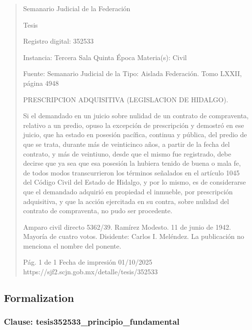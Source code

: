 \documentclass[11pt,a4paper]{article}
\begin{document}
\begin{quote}
                                                   Semanario Judicial de la Federación

                                                  Tesis

 Registro digital: 352533

 Instancia: Tercera Sala          Quinta Época                         Materia(s): Civil

                                  Fuente: Semanario Judicial de la     Tipo: Aislada
                                  Federación.
                                  Tomo LXXII, página 4948


PRESCRIPCION ADQUISITIVA (LEGISLACION DE HIDALGO).


Si el demandado en un juicio sobre nulidad de un contrato de compraventa, relativo a un predio,
opuso la excepción de prescripción y demostró en ese juicio, que ha estado en posesión pacífica,
continua y pública, del predio de que se trata, durante más de veinticinco años, a partir de la fecha
del contrato, y más de veintiuno, desde que el mismo fue registrado, debe decirse que ya sea que
esa posesión la hubiera tenido de buena o mala fe, de todos modos transcurrieron los términos
señalados en el artículo 1045 del Código Civil del Estado de Hidalgo, y por lo mismo, es de
considerarse que el demandado adquirió en propiedad el inmueble, por prescripción adquisitiva, y
que la acción ejercitada en su contra, sobre nulidad del contrato de compraventa, no pudo ser
procedente.


Amparo civil directo 5362/39. Ramírez Modesto. 11 de junio de 1942. Mayoría de cuatro votos.
Disidente: Carlos I. Meléndez. La publicación no menciona el nombre del ponente.




                                             Pág. 1 de 1             Fecha de impresión 01/10/2025
  https://sjf2.scjn.gob.mx/detalle/tesis/352533

\end{quote}

\subsection{Formalization}

\subsubsection{Clause: tesis352533\_principio\_fundamental}
\end{document}
